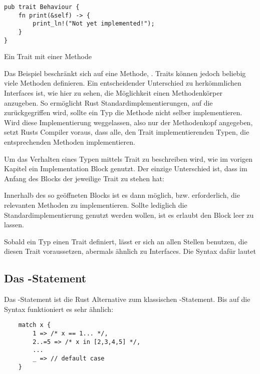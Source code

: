 \begin{listing}[th]
\begin{verbatim}
pub trait Behaviour {
    fn print(&self) -> {
        print_ln!("Not yet implemented!");
    }
}
\end{verbatim}
\label{lst:trait}
\caption{Ein Trait mit einer Methode}
\end{listing}

Das Beispiel beschränkt sich auf eine Methode, . Traits können jedoch beliebig viele Methoden definieren. Ein entscheidender Unterschied zu herkömmlichen Interfaces ist, wie hier zu sehen, die Möglichkeit einen Methodenkörper anzugeben. So ermöglicht Rust Standardimplementierungen, auf die zurückgegriffen wird, sollte ein Typ die Methode nicht selber implementieren. Wird diese Implementierung weggelassen, also nur der Methodenkopf angegeben, setzt Rusts Compiler voraus, dass alle, den Trait implementierenden Typen, die entsprechenden Methoden implementieren.

Um das Verhalten eines Typen mittels Trait zu beschreiben wird, wie im vorigen Kapitel ein Implementation Block genutzt. Der einzige Unterschied ist, dass im Anfang des Blocks der jeweilige Trait zu stehen hat:


Innerhalb des so geöffneten Blocks ist es dann möglich, bzw. erforderlich, die relevanten Methoden zu implementieren. Sollte lediglich die Standardimplementierung genutzt werden wollen, ist es erlaubt den Block leer zu lassen.

Sobald ein Typ einen Trait definiert, lässt er sich an allen Stellen benutzen, die diesen Trait voraussetzen, abermals ähnlich zu Interfaces. Die Syntax dafür lautet 


\subsection{Das -Statement}

Das -Statement ist die Rust Alternative zum klassischen -Statement. Bis auf die Syntax funktioniert es sehr ähnlich:

\begin{verbatim}
    match x {
        1 => /* x == 1... */,
        2..=5 => /* x in [2,3,4,5] */,
        ...
        _ => // default case
    }
\end{verbatim}

